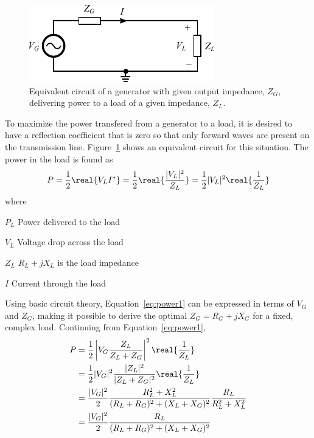 \begin{figure}[htbp]
    \centering
    \includegraphics{img/analysis/generator_load}
    \caption{Equivalent circuit of a generator with given output impedance, $Z_G$, delivering power to a load of a given impedance, $Z_L$.}
    \label{fig:generator_load}
\end{figure}

To maximize the power transfered from a generator to a load, it is desired to have a reflection coefficient that is zero so that only forward waves are present on the transmission line. Figure~\ref{fig:generator_load} shows an equivalent circuit for this situation. The power in the load is found as \cite{pozar2011microwave}
\begin{equation}
    \label{eq:power1}
    P = \frac{1}{2} \real{V_LI^*} = \frac{1}{2} \real{\frac{|V_L|^2}{Z_L}}
    = \frac{1}{2} |V_L|^2 \real{\frac{1}{Z_L}}
\end{equation}
where
\begin{where}
\item[$P_L$] Power delivered to the load
\item[$V_L$] Voltage drop across the load
\item[$Z_L$] $R_L+jX_L$ is the load impedance
\item[$I$] Current through the load
\end{where}
Using basic circuit theory, Equation~\ref{eq:power1} can be expressed in terms of $V_G$ and $Z_G$, making it possible to derive the optimal $Z_G = R_G+jX_G$ for a fixed, complex load. Continuing from Equation~\ref{eq:power1},
\begin{equation}
    \begin{aligned}
        P &= \frac{1}{2} \left| V_G \frac{Z_L}{Z_L+Z_G} \right|^2 \real{\frac{1}{Z_L}} \\
        &= \frac{1}{2} |V_G|^2 \frac{|Z_L|^2}{|Z_L+Z_G|^2} \real{\frac{1}{Z_L}}\\
        &= \frac{|V_G|^2}{2} \frac{R_L^2+X_L^2}{(R_L+R_G)^2+(X_L+X_G)^2} \frac{R_L}{R_L^2 + X_L^2}\\
        &= \frac{|V_G|^2}{2} \frac{R_L}{(R_L+R_G)^2 + (X_L+X_G)^2}
    \end{aligned}
\end{equation}
